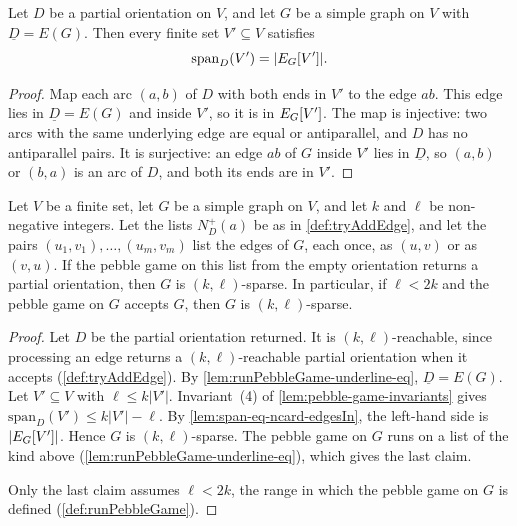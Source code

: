 \begin{lemma}
  \label{lem:span-eq-ncard-edgesIn}
  \leanok
  Let $D$ be a partial orientation on $V$, and let $G$ be a simple graph
  on $V$ with $\underline{D} = E(G)$. Then every finite set
  $V' \subseteq V$ satisfies
  \[
    \mathrm{span}_D(V') = |\edgesIn[G]{V'}|.
  \]
\end{lemma}
\begin{proof}
  \leanok
  Map each arc $(a, b)$ of $D$ with both ends in $V'$ to the edge $ab$.
  This edge lies in $\underline{D} = E(G)$ and inside $V'$, so it is in
  $\edgesIn[G]{V'}$. The map is injective: two arcs with the same
  underlying edge are equal or antiparallel, and $D$ has no
  antiparallel pairs. It is surjective: an edge $ab$ of $G$ inside $V'$
  lies in $\underline{D}$, so $(a, b)$ or $(b, a)$ is an arc of $D$, and
  both its ends are in $V'$.
\end{proof}

\begin{theorem}
  \label{thm:pebble-game-soundness}
  \leanok
  Let $V$ be a finite set, let $G$ be a simple graph on $V$, and let $k$
  and $\ell$ be non-negative integers. Let the lists $N^+_D(a)$ be as
  in \cref{def:tryAddEdge}, and let the pairs
  $(u_1, v_1), \ldots, (u_m, v_m)$ list the edges of $G$, each once, as
  $(u, v)$ or as $(v, u)$. If the pebble game on this list from the
  empty orientation returns a partial orientation, then $G$ is
  $(k, \ell)$-sparse. In particular, if $\ell < 2k$ and the pebble game
  on $G$ accepts $G$, then $G$ is $(k, \ell)$-sparse.
\end{theorem}
\begin{proof}
  \leanok
  Let $D$ be the partial orientation returned. It is
  $(k, \ell)$-reachable, since processing an edge returns a
  $(k, \ell)$-reachable partial orientation when it accepts
  (\cref{def:tryAddEdge}). By \cref{lem:runPebbleGame-underline-eq},
  $\underline{D} = E(G)$. Let $V' \subseteq V$ with $\ell \le k|V'|$.
  Invariant~(4) of \cref{lem:pebble-game-invariants} gives
  $\mathrm{span}_D(V') \le k|V'| - \ell$. By
  \cref{lem:span-eq-ncard-edgesIn}, the left-hand side is
  $|\edgesIn[G]{V'}|$. Hence $G$ is $(k, \ell)$-sparse. The pebble game
  on $G$ runs on a list of the kind above
  (\cref{lem:runPebbleGame-underline-eq}), which gives the last claim.

  Only the last claim assumes $\ell < 2k$, the range in which the
  pebble game on $G$ is defined (\cref{def:runPebbleGame}).
\end{proof}

